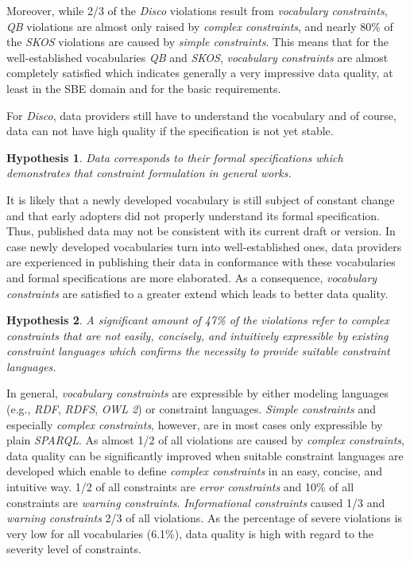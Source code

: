 \documentclass{llncs}
\newcommand{\tb}[1]{\todo[size=\small, color=green!40]{\textbf{Thomas:} #1}}
\newtheorem{hyp}{Hypothesis}
\begin{document}
Moreover, while 2/3 of the \emph{Disco} violations result from \emph{vocabulary constraints},
\emph{QB} violations are almost only raised by \emph{complex constraints}, and 
nearly 80\% of the \emph{SKOS} violations are caused by \emph{simple constraints}.
This means that for the well-established vocabularies \emph{QB} and \emph{SKOS}, \emph{vocabulary constraints} are almost completely satisfied which indicates generally a very impressive data quality, at least in the SBE domain and for the basic requirements.

For \emph{Disco}, data providers still have to understand the vocabulary and of course, data can not have high quality if the specification is not yet stable.

\begin{hyp}
Data corresponds to their formal specifications which demonstrates that constraint formulation in general works. 
\end{hyp}



It is likely that a newly developed vocabulary is still subject of constant change
and that early adopters did not properly understand its formal specification.
Thus, published data may not be consistent with its current draft or version.
In case newly developed vocabularies turn into well-established ones,
data providers are experienced in publishing their data in conformance with these vocabularies
and formal specifications are more elaborated. 
As a consequence, \emph{vocabulary constraints} are satisfied to a greater extend which leads to better data quality.  

\begin{hyp}
A significant amount of 47\% of the violations refer to complex constraints that are not easily, concisely, and intuitively expressible by existing constraint languages which confirms the necessity to provide suitable constraint languages.
\end{hyp} 

In general, \emph{vocabulary constraints} are expressible by either modeling languages (e.g., \emph{RDF}, \emph{RDFS}, \emph{OWL 2}) or constraint languages. 
\emph{Simple constraints} and especially \emph{complex constraints}, however, are in most cases only expressible by plain \emph{SPARQL}. 
As almost 1/2 of all violations are caused by \emph{complex constraints}, 
data quality can be significantly improved when suitable constraint languages are developed which enable to define \emph{complex constraints} in an easy, concise, and intuitive way.
1/2 of all constraints are \emph{error constraints} and
10\% of all constraints are \emph{warning constraints}.
\emph{Informational constraints} caused 1/3 and
\emph{warning constraints} 2/3 of all violations.
As the percentage of severe violations is very low for all vocabularies (6.1\%),
data quality is high with regard to the severity level of constraints.
\end{document}
